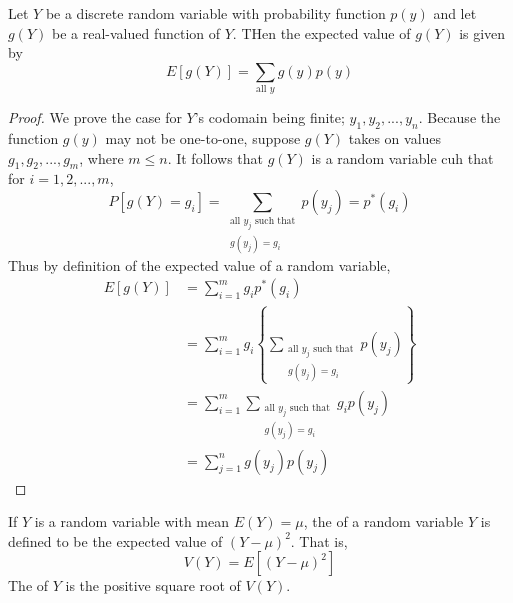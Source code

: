 \documentclass[12pt, a4paper, twoside, openright, titlepage]{book}
\begin{document}
\begin{thm}{}{}
    Let $Y$ be a discrete random variable with probability function $p(y)$ and let $g(Y)$ be a real-valued function of $Y$. THen the expected value of $g(Y)$ is given by \begin{equation*}
        E[g(Y)] = \sum\limits_{\text{all }y}g(y)p(y)
    \end{equation*}
\end{thm}
\begin{proof}{}{}
    We prove the case for $Y$'s codomain being finite; $y_1,y_2,...,y_n$. Because the function $g(y)$ may not be one-to-one, suppose $g(Y)$ takes on values $g_1,g_2,...,g_m$, where $m \leq n$. It follows that $g(Y)$ is a random variable cuh that for $i = 1,2,...,m$, \begin{equation*}
        P[g(Y)=g_i] = \sum\limits_{\begin{array}{c} \text{all } y_j\text{ such that} \\ g(y_j) = g_i\end{array}}p(y_j) = p^*(g_i)
    \end{equation*}
    Thus by definition of the expected value of a random variable, \begin{align*}
        E[g(Y)] &= \sum\limits_{i=1}^mg_ip^*(g_i) \\
        &= \sum\limits_{i=1}^mg_i\left\{\sum\limits_{\begin{array}{c} \text{all } y_j\text{ such that} \\ g(y_j) = g_i\end{array}}p(y_j)\right\} \\
        &= \sum\limits_{i=1}^m\sum\limits_{\begin{array}{c} \text{all } y_j\text{ such that} \\ g(y_j) = g_i\end{array}}g_ip(y_j) \\
            &= \sum\limits_{j=1}^ng(y_j)p(y_j)
    \end{align*}
\end{proof}

\begin{defn}{}{}
    If $Y$ is a random variable with mean $E(Y) = \mu$, the  of a random variable $Y$ is defined to be the expected value of $(Y-\mu)^2$. That is, \begin{equation*}
        V(Y) = E[(Y-\mu)^2]
    \end{equation*}
    The  of $Y$ is the positive square root of $V(Y)$.
\end{defn}
\end{document}

